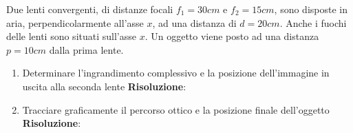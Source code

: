 \documentclass{article}
\begin{document}

    \item Due lenti convergenti, di distanze focali $f_1 = 30 cm$ e $f_2 = 15 cm$, sono
    disposte in aria, perpendicolarmente all’asse $x$, ad una distanza di $d =
    20 cm$. Anche i fuochi delle lenti sono situati sull’asse $x$. Un oggetto
    viene posto ad una distanza $p = 10 cm$ dalla prima lente.

    \begin{enumerate}
        
        \item Determinare l’ingrandimento complessivo e la posizione
        dell’immagine in uscita alla seconda lente
        \newline 
        \textbf{Risoluzione}:

        \item Tracciare graficamente il percorso ottico e la posizione finale dell’oggetto
        \newline 
        \textbf{Risoluzione}:

    \end{enumerate}
\end{document}
